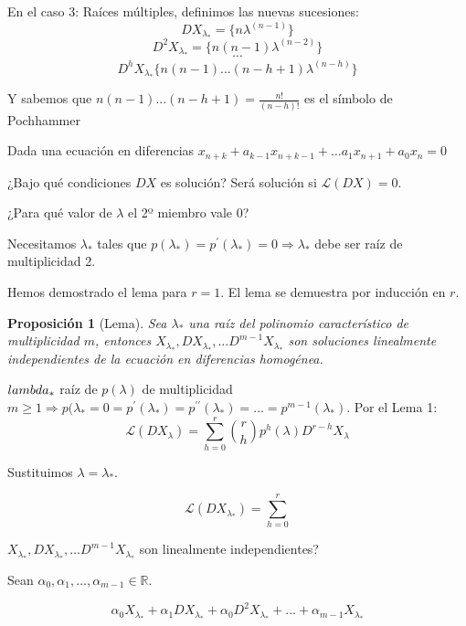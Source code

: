\documentclass[11pt, a4paper, titlepage]{article}
\makeatletter
\renewenvironment{proof}[1][\proofname] {\vspace{-15pt}\par\pushQED{\qed}\normalfont\topsep6\p@\@plus6\p@\relax\trivlist\item[\hskip\labelsep\it#1\@addpunct{.}]\ignorespaces}{\popQED\endtrivlist\@endpefalse}
\newcommand{\R}{\mathbb{R}}
\theoremstyle{theorem-style}
\newtheorem*{nprop}{Proposición}
\theoremstyle{definition-style}
\theoremstyle{remark-style}
\theoremstyle{example-style}
\makeatother
\begin{document}
      En el caso 3: Raíces múltiples, definimos las nuevas sucesiones:
$$ DX_{\lambda_*} =\{n\lambda^{(n-1)}\}$$
$$ D^2X_{\lambda_*}= \{n(n-1)\lambda^{(n-2)}\} $$
$$ \cdots $$
$$ D^hX_{\lambda_*}\{n(n-1)...(n-h+1)\lambda^{(n-h)}\}$$

Y sabemos que $n(n-1)...(n-h+1) = \frac{n!}{(n-h)!}$ es el símbolo de Pochhammer

Dada una ecuación en diferencias
$x_{n+k} + a_{k-1}x_{n+k-1} + \hdots a _1x_{n+1} + a_0x_n = 0$



¿Bajo qué condiciones $DX$ es solución? Será solución si $\mathcal{L}(DX) = 0$.

¿Para qué valor de $\lambda$ el 2º miembro vale 0?

Necesitamos $\lambda_{\ast}$ tales que
$p(\lambda_{\ast}) = p^{\prime}(\lambda_{\ast}) = 0 \Rightarrow \lambda_{\ast}$
debe ser raíz de multiplicidad 2.

Hemos demostrado el lema para $r = 1$. El lema se demuestra por inducción en
$r$.

\begin{nprop}[Lema]
  Sea $\lambda_{\ast}$ una raíz del polinomio característico de multiplicidad
  $m$, entonces
  $X_{\lambda_{\ast}}, DX_{\lambda_{\ast}}, \hdots D^{m-1}X_{\lambda_{\ast}}$
  son soluciones linealmente independientes de la ecuación en diferencias
  homogénea.
\end{nprop}

\begin{proof}
  $\\lambda_{\ast}$ raíz de $p(\lambda)$ de multiplicidad
  $m \geq 1 \Rightarrow p(\lambda_{\ast} = 0 = p^{\prime}(\lambda_{\ast}) =
  p^{\prime \prime}(\lambda_{\ast}) = \hdots = p^{m-1}(\lambda_{\ast})$. Por el
  Lema 1:
	$$ \mathcal{L}(DX_{\lambda}) = \sum_{h = 0}^r \binom{r}{h}p^h(\lambda)D^{r-h}X_{\lambda}$$
	
	Sustituimos $\lambda = \lambda_{\ast}$.
	
	$$\mathcal{L}(DX_{\lambda_{\ast}}) = \sum_{h = 0}^{r}$$
	
	$X_{\lambda_{\ast}}, DX_{\lambda_{\ast}}, \hdots
        D^{m-1}X_{\lambda_{\ast}}$ son linealmente independientes?
	
	Sean $\alpha_0, \alpha_1, \hdots, \alpha_{m-1} \in \R$.
	
	$$\alpha_0X_{\lambda_{\ast}} + \alpha_1DX_{\lambda_{\ast}} + \alpha_0D^2X_{\lambda_{\ast}} + \hdots + \alpha_{m-1}X_{\lambda_{\ast}}$$
	
	
      \end{proof}
\end{document}
